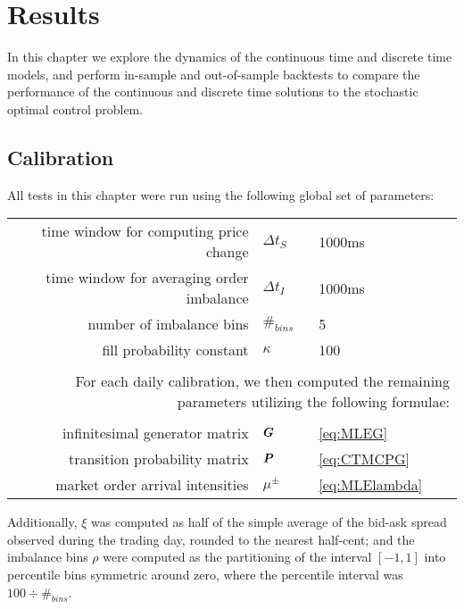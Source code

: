 \chapter{Results}

In this chapter we explore the dynamics of the continuous time and discrete time models, and perform in-sample and out-of-sample backtests to compare the performance of the continuous and discrete time solutions to the stochastic optimal control problem.

\section{Calibration}

All tests in this chapter were run using the following global set of parameters:
\begin{center}
\begin{tabular}{rll}
time window for computing price change & $\Delta t_S$ & 1000ms \\
time window for averaging order imbalance & $\Delta t_I$ & 1000ms \\
number of imbalance bins & $\#_{bins}$ & 5 \\
fill probability constant & $\kappa$ & 100 \\
&& \\
\multicolumn{3}{p{\linewidth}}{For each daily calibration, we then computed the remaining parameters utilizing the following formulae:} \\
&& \\
infinitesimal generator matrix & $\boldsymbol{G}$ & \autoref{eq:MLEG} \\
transition probability matrix & $\boldsymbol{P}$ & \autoref{eq:CTMCPG} \\
market order arrival intensities & $\mu^\pm$ & \autoref{eq:MLElambda}
\end{tabular}
\end{center}

Additionally, $\xi$ was computed as half of the simple average of the bid-ask spread observed during the trading day, rounded to the nearest half-cent; and the imbalance bins $\rho$ were computed as the partitioning of the interval $[-1,1]$ into percentile bins symmetric around zero, where the percentile interval was $100 \div \#_{bins}$.

